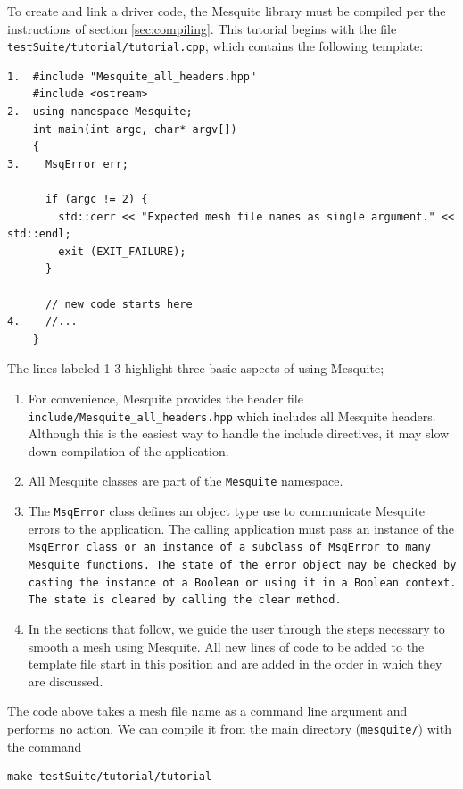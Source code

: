 To create and link a driver code, the Mesquite library must be
compiled per the instructions of section \ref{sec:compiling}. 
This tutorial begins with the file \newline
\texttt{testSuite/tutorial/tutorial.cpp}, 
which contains the following template:
\begin{verbatim}
1.  #include "Mesquite_all_headers.hpp"
    #include <ostream>
2.  using namespace Mesquite;
    int main(int argc, char* argv[])
    {
3.    MsqError err;

      if (argc != 2) {
        std::cerr << "Expected mesh file names as single argument." << std::endl;
        exit (EXIT_FAILURE);
      }

      // new code starts here
4.    //... 
    }
\end{verbatim}
The lines labeled 1-3 highlight three basic aspects of using Mesquite;
\begin{enumerate}
\item For convenience, Mesquite provides the header file
\texttt{include/Mesquite\_all\_headers.hpp} which includes all Mesquite
headers. Although this is the easiest way to handle the include directives,
it may slow down compilation of the application.  
\item All Mesquite classes are part of the \texttt{Mesquite} namespace. 

\item  The \texttt{MsqError} class defines an object type use to communicate
Mesquite errors to the application.  The calling application must pass
an instance of the \tt{MsqError} class or an instance of a subclass of
\tt{MsqError} to many Mesquite functions.  The state of the error object
may be checked by casting the instance ot a Boolean or using it in a 
Boolean context.  The state is cleared by calling the \tt{clear} method.
\item In the sections that follow, we guide the user through the steps
necessary to smooth a mesh using Mesquite.  All new lines of code to be
added to the template file start in this position and are added in the order
in which they are discussed.
\end{enumerate}

The code above takes a mesh file name as a command line argument and
performs no action. We can compile it from the main directory
(\texttt{mesquite/}) with the command 
\begin{verbatim}
make testSuite/tutorial/tutorial
\end{verbatim}

